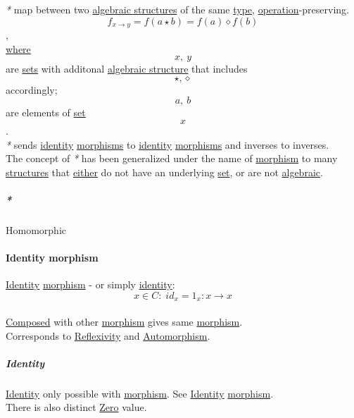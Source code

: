 \documentclass[11pt]{article}
\begin{document}
\emph{*} map between two \hyperref[orgbade927]{algebraic structures} of the same \hyperref[org4fbaeb8]{type}, \hyperref[org87d485b]{operation}-preserving.\\

$$ f_{x \to y} = f(a \star b) = f(a) \diamond f(b) $$,\\
\hyperref[orgefd1ecd]{where} $$ x,\ y $$ are \hyperref[org4e7443a]{sets} with additonal \hyperref[org461d8c5]{algebraic structure} that includes $$ \star, \diamond $$ accordingly; $$ a,\ b $$ are elements of \hyperref[orgbed80ba]{set} $$ x $$.\\

\emph{*} sends \hyperref[org3bbbadd]{identity} \hyperref[org8ed0ce8]{morphisms} to \hyperref[org3bbbadd]{identity} \hyperref[org8ed0ce8]{morphisms} and inverses to inverses.\\

The concept of \emph{*} has been generalized under the name of \hyperref[orgad99fc6]{morphism} to many \hyperref[org51d1eff]{structures} that \hyperref[orgbc5fdf7]{either} do not have an underlying \hyperref[orgbed80ba]{set}, or are not \hyperref[orgf3466c3]{algebraic}.\\

\subparagraph{\emph{*}}
\label{sec:orgca14ca2}

\label{orgef271a3}Homomorphic\\

\paragraph{\label{org87947cf}Identity morphism}
\label{sec:org7439225}
\hyperref[org3bbbadd]{Identity} \hyperref[orgad99fc6]{morphism} - or simply \hyperref[org3bbbadd]{identity}: $$ x \in C : \; id_{x}=1_{x} : x \to x $$\\
\hyperref[orgb941f76]{Composed} with other \hyperref[orgad99fc6]{morphism} gives same \hyperref[orgad99fc6]{morphism}.\\

Corresponds to \hyperref[orge2dcddf]{Reflexivity} and \hyperref[org32af9c0]{Automorphism}.\\

\subparagraph{\label{org3bbbadd}Identity}
\label{sec:org55c3fd1}
\hyperref[org3bbbadd]{Identity} only possible with \hyperref[orgad99fc6]{morphism}. See \hyperref[org3bbbadd]{Identity} \hyperref[orgad99fc6]{morphism}.\\

There is also distinct \hyperref[orgf8da8e8]{Zero} value.\\
\end{document}
